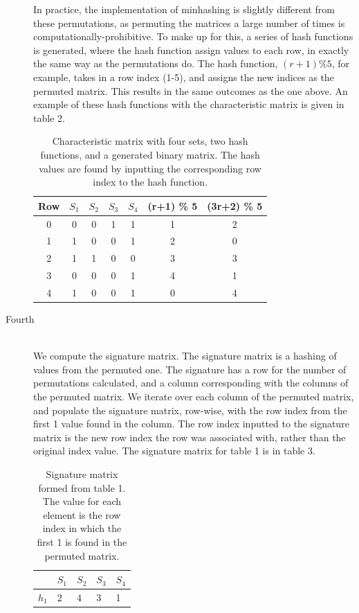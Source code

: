 \documentclass[11pt]{article}
\begin{document}
\begin{description}
In practice, the implementation of minhashing is slightly different from these permutations, as permuting the matrices a large number of times is computationally-prohibitive. To make up for this, a series of hash functions is generated, where the hash function assign values to each row, in exactly the same way as the permutations do. The hash function, $(r + 1) \% 5$, for example, takes in a row index (1-5), and assigns the new indices as the permuted matrix. This results in the same outcomes as the one above. An example of these hash functions with the characteristic matrix is given in table 2.

\begin{table}[h]
\begin{center}
\begin{tabular}{@{}ccccc|cc@{}}
\toprule
Row & $S_{1}$ & $S_{2}$ & $S_{3}$ & $S_{4}$ & (r+1) \% 5 & (3r+2) \% 5 \\ \midrule
0   & 0  & 0  & 1  & 1  & 1          & 2           \\
1   & 1  & 0  & 0  & 1  & 2          & 0           \\
2   & 1  & 1  & 0  & 0  & 3          & 3           \\
3   & 0  & 0  & 0  & 1  & 4          & 1           \\
4   & 1  & 0  & 0  & 1  & 0          & 4           \\ \bottomrule
\end{tabular}
\label{fig:hash-mat}
\caption{Characteristic matrix with four sets, two hash functions, and a generated binary matrix. The hash values are found by inputting the corresponding row index to the hash function.}
\end{center}
\end{table}

\item[Fourth] \hfill \\
We compute the signature matrix. The signature matrix is a hashing of values from the permuted one. The signature has a row for the number of permutations calculated, and a column corresponding with the columns of the permuted matrix. We iterate over each column of the permuted matrix, and populate the signature matrix, row-wise, with the row index from the first 1 value found in the column. The row index inputted to the signature matrix is the new row index the row was associated with, rather than the original index value. The signature matrix for table 1 is in table 3.

\begin{table}[h]
\begin{center}
\begin{tabular}{@{}lllll@{}}
\toprule
        & $S_{1}$ & $S_{2}$ & $S_{3}$ & $S_{4}$ \\ \midrule
$h_{1}$ & 2       & 4       & 3       & 1       \\ \bottomrule
\end{tabular}
\label{fig:signature}
\caption{Signature matrix formed from table 1. The value for each element is the row index in which the first 1 is found in the permuted matrix.}
\end{center}
\end{table}


\end{description}
\end{document}
